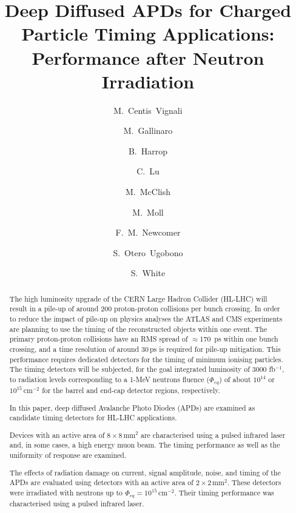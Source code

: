\documentclass[review,number,sort&compress]{elsarticle}
\begin{document}
\begin{frontmatter}

\title{Deep Diffused APDs for Charged Particle Timing Applications: Performance after Neutron Irradiation}

\author[cern]{M.~Centis~Vignali}

\author[cern,lip]{M.~Gallinaro}
\author[uprinc]{B.~Harrop}
\author[uprinc]{C.~Lu}
\author[rmd]{M.~McClish}
\author[cern]{M.~Moll}
\author[upenn]{F.~M.~Newcomer}
\author[cern,usan]{S.~Otero~Ugobono}
\author[cern,uvirg]{S.~White}

\address[cern]{CERN, Geneva, Switzerland}
\address[lip]{LIP, Lisbon, Portugal}
\address[uprinc]{Princeton University, Princeton, USA}
\address[rmd]{Radiation Monitoring Devices, Watertown, USA}
\address[upenn]{University of Pennsylvania, Philadelphia, USA}
\address[usan]{Universidade de Santiago de Compostela, Santiago de Compostela, Spain}
\address[uvirg]{University of Virginia, Charlottesville, USA}

\begin{abstract}
The high luminosity upgrade of the CERN Large Hadron Collider (HL-LHC) will result in a pile-up of around 200 proton-proton collisions per bunch crossing.
In order to reduce the impact of pile-up on physics analyses the ATLAS and CMS experiments are planning to use the timing of the reconstructed objects within one event.
The primary proton-proton collisions have an RMS spread of $\approx$170~ps within one bunch crossing, and a time resolution of around 30\,ps is required for pile-up mitigation.
This performance requires dedicated detectors for the timing of minimum ionising particles.
The timing detectors will be subjected, for the goal integrated luminosity of 3000 fb$^{-1}$, to radiation levels corresponding to a 1-MeV neutrons fluence ($\Phi_{eq}$) of about $10^{14}$ or $10^{15}$\,cm$^{-2}$ for the barrel and end-cap detector regions, respectively.
  
In this paper, deep diffused Avalanche Photo Diodes (APDs) are examined as candidate timing detectors for HL-LHC applications.

Devices with an active area of $8 \times 8$\,mm$^2$ are characterised using a pulsed infrared laser and, in some cases, a high energy muon beam.
The timing performance as well as the uniformity of response are examined.

The effects of radiation damage on current, signal amplitude, noise, and timing of the APDs are evaluated using detectors with an active area of $2 \times 2$\,mm$^2$.
These detectors were irradiated with neutrons up to $\Phi_{eq} = 10^{15}$\,cm$^{-2}$.
Their timing performance was characterised using a pulsed infrared laser.


\end{abstract}

\end{frontmatter}
\end{document}
